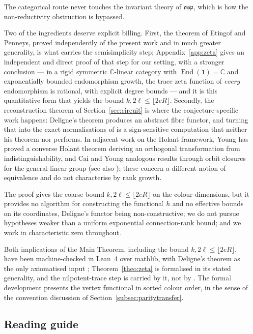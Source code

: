 \documentclass[11pt]{article}
\newcommand{\unitobj}{\mathbf{1}}                 %
\newcommand{\End}{\operatorname{End}}
\begin{document}
The categorical route never touches the invariant theory of
$\mathfrak{osp}$, which is how the non-reductivity obstruction
is bypassed.

Two of the ingredients deserve explicit billing. First, the
theorem of Etingof and Penneys, proved independently of the
present work and in much greater generality, is what carries the
semisimplicity step; Appendix~\ref{app:zeta} gives an
independent and direct proof of that step for our setting,
with a stronger conclusion --- in a rigid symmetric
$\mathbb{C}$-linear category with $\End(\unitobj)=\mathbb{C}$ and
exponentially bounded endomorphism growth, the trace zeta
function of \emph{every} endomorphism is rational, with explicit
degree bounds --- and it is this quantitative form that yields
the bound $k,2\ell\le\lfloor 2eR\rfloor$. Secondly, the
reconstruction theorem of
Section~\ref{sec:circuit} is where the conjecture-specific work
happens: Deligne's theorem produces an abstract fibre functor,
and turning that into the exact normalisations of
\cite[Definition~5]{RS21} is a sign-sensitive computation that
neither his theorem nor
\cite{EP26} performs. In adjacent work on the Holant framework,
Young \cite{You25} has proved a converse Holant theorem deriving
an orthogonal transformation from indistinguishability, and Cai
and Young \cite{CY26} analogous results through orbit closures
for the general linear group (see also \cite{CG22}); these concern
a different notion of equivalence and do not characterise by
rank growth.

The proof
gives the coarse bound $k,2\ell\le\lfloor 2eR\rfloor$ on the
colour dimensions,
but it provides no algorithm for constructing the functional $h$
and no effective bounds on its coordinates, Deligne's functor being
non-constructive; we do not pursue hypotheses weaker than a
uniform exponential connection-rank bound; and we work in
characteristic zero throughout.

Both implications of the Main Theorem, including the bound
$k,2\ell\le\lfloor 2eR\rfloor$, have been machine-checked in
Lean~4 over mathlib, with Deligne's theorem \cite[Thm~0.6]{Del02}
as the only axiomatised input \cite{Whi26};
Theorem~\ref{theo:zeta} is formalised in its stated generality,
and the nilpotent-trace step is carried by it, not by
\cite{EP26}. The formal development presents
the vertex functional in sorted colour order, in the sense of the
convention discussion of Section~\ref{subsec:paritytransfer}.

\subsection{Reading guide}\label{subsec:overview}
\end{document}
